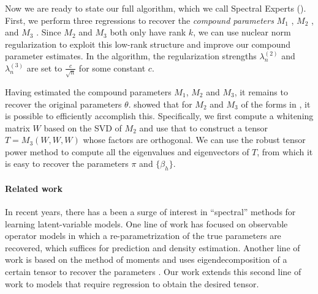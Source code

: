 Now we are ready to state our full algorithm, which we call Spectral Experts
().
First, we perform three regressions to recover the \emph{compound parameters}
$M_1$ ,
$M_2$ , and
$M_3$ .
Since $M_2$ and $M_3$ both only have rank $k$,
we can use nuclear norm regularization
\cite{Tomioka2011,NegahbanWainwright2009}
to exploit this low-rank structure and improve our compound parameter estimates.
In the algorithm, the regularization strengths $\lambda_n^{(2)}$ and $\lambda_n^{(3)}$
are set to $\frac{c}{\sqrt{n}}$ for some constant $c$.

Having estimated the compound parameters $M_1$, $M_2$ and $M_3$, it
remains to recover the original parameters $\theta$.
\citet{AnandkumarGeHsu2012} showed that for $M_2$ and $M_3$ of
the forms in , it is possible to efficiently accomplish this.
Specifically, we first compute a whitening matrix $W$ based on the SVD of $M_2$
and use that to construct a tensor $T = M_3(W, W, W)$ whose factors are orthogonal.
We can use the robust tensor power method to compute all the
eigenvalues and eigenvectors of $T$, from which it is easy to recover
the parameters $\pi$ and $\{\beta_h\}$.

\paragraph{Related work}

In recent years, there has a been a surge of interest in ``spectral'' methods
for learning latent-variable models.  One line of work has
focused on observable operator models \cite{hsu09spectral,song10kernel,parikh12spectral,cohen12pcfg,balle11transducer,balle12automata}
in which a re-parametrization of the true parameters are recovered,
which suffices for prediction and density estimation.
Another line of work is based on the method of moments and uses eigendecomposition of a certain tensor
to recover the parameters \cite{anandkumar12moments,anandkumar12lda,hsu12identifiability,hsu13spherical}.
Our work extends this second line of work to models that
require regression to obtain the desired tensor.

